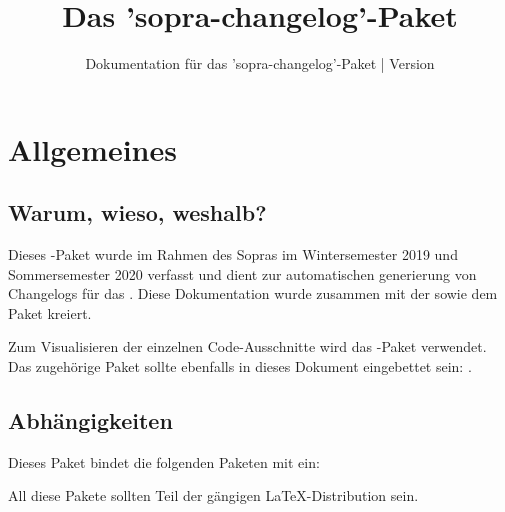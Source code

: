 \documentclass{sopra-base}
\title{Das 'sopra-changelog'-Paket}
\subtitle[Dokumentation für das 'sopra-changelog'-Paket]{Dokumentation für das 'sopra-changelog'-Paket | Version \thesocversion}
\begin{document}
    \maketitle
%
%
%
%

\section{Allgemeines}
\subsection{Warum, wieso, weshalb?}
    Dieses \LaTeXe-Paket wurde im Rahmen des Sopras im
    Wintersemester 2019 und Sommersemester 2020 verfasst und dient zur automatischen generierung von Changelogs für das . Diese Dokumentation wurde zusammen mit der
     sowie dem Paket  kreiert.\par
    Zum Visualisieren der einzelnen Code-Ausschnitte wird das
    -Paket verwendet.
    Das zugehörige Paket sollte ebenfalls in dieses Dokument eingebettet sein: . 
\subsection{Abhängigkeiten}
    Dieses Paket bindet die folgenden Paketen mit ein:
    \begin{multicols}{4}
    \end{multicols}
    All diese Pakete sollten Teil der gängigen \LaTeX-Distribution sein.
\end{document}
